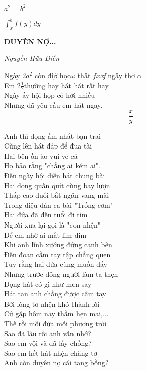 \documentclass[onesite]{article}
\begin{document}
\parindent=0pt

$a^2=b^2$

$\int_{x}^{b}f(y)dy$

 {\bf DUYÊN NỢ...}
\vskip0.5cm

\hspace*{5cm} {\it Nguyễn Hữu Điển}

Ngày 2$a^2$ còn đi$\beta$ học$\omega$ thật $fx$\textit{xf} ngây thơ $\alpha$\\
Em 2$\frac{1}{2}$thường hay hát hát rất hay\\
Ngày ấy hội họp có hơi nhiều\\
Nhưng đã yêu cầu em hát ngay.\\
 $$\frac{x}{y}$$

Anh thì dọng ấm nhất bạn trai\\
Cũng lên hát đáp để đua tài\\
Hai bên ồn ào vui vẻ cả\\
Họ bảo rằng "chẳng ai kém ai".\\
 

Đến ngày hội diễn hát chung bài\\
Hai dọng quấn quít cùng bay lượn\\
Thấp cao đuổi bắt ngân vang mãi\\
Trong điệu dân ca bài "Trống cơm"\\
 

Hai đứa đã đến tuổi đi tìm\\
Người xưa lại gọi là "con nhện"\\
Để em nhớ ai mắt lim dim\\
Khi anh lĩnh xướng đứng cạnh bên\\
 

Đến đoạn cầm tay tập chẳng quen\\
Tuy rằng hai đứa cùng muốn đấy\\
Nhưng trước đông người làm ta thẹn\\
Dọng hát có gì như men say\\

Hát tan anh chẳng được cầm tay\\
Bởi lòng tơ nhện khó thành lời\\
Cứ gặp hôm nay thầm hẹn mai,...\\
Thế rồi mỗi đứa mỗi phương trời\\

Sao đã lâu rồi anh vẫn nhớ?\\
Sao em vội vã đã lấy chồng?\\
Sao em hết hát nhện chăng tơ\\
Anh còn duyên nợ cái tang bồng?\\
\end{document}
